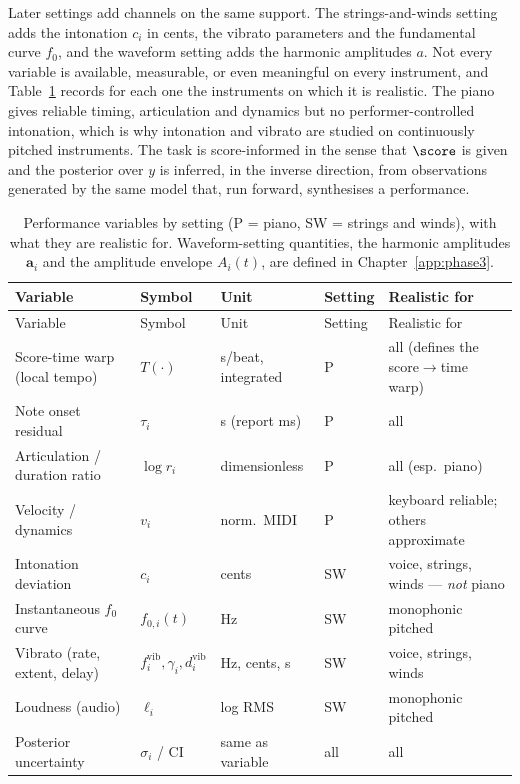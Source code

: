 Later settings add channels on the same support. The strings-and-winds
setting adds the intonation $c_i$ in cents, the vibrato parameters and the
fundamental curve $f_0$, and the waveform setting adds the harmonic
amplitudes $a$. Not every variable is available, measurable, or even
meaningful on every instrument, and Table~\ref{tab:variables} records for
each one the instruments on which it is realistic. The piano gives reliable
timing, articulation and dynamics but no performer-controlled intonation,
which is why intonation and vibrato are studied on continuously pitched
instruments. The task is score-informed in the sense that $\score$ is given
and the posterior over $y$ is inferred, in the inverse direction, from
observations generated by the same model that, run forward, synthesises a
performance.

{\footnotesize
\begin{longtable}{@{}p{3.1cm}p{2.0cm}p{2.0cm}p{0.9cm}p{4.4cm}@{}}
\caption{Performance variables by setting (P = piano, SW = strings and
winds), with what they are realistic for. Waveform-setting quantities,
the harmonic amplitudes $\mathbf a_i$ and the amplitude envelope $A_i(t)$, are
defined in Chapter~\ref{app:phase3}.}
\label{tab:variables}\\
\toprule
Variable & Symbol & Unit & Setting & Realistic for \\
\midrule
\endfirsthead
\toprule
Variable & Symbol & Unit & Setting & Realistic for \\
\midrule
\endhead
\bottomrule
\endfoot
Score-time warp (local tempo) & $T(\cdot)$ & s/beat, integrated & P & all (defines the score$\to$time warp) \\
Note onset residual & $\tau_i$ & s (report ms) & P & all \\
Articulation / duration ratio & $\log r_i$ & dimensionless & P & all (esp.\ piano) \\
Velocity / dynamics & $v_i$ & norm.\ MIDI & P & keyboard reliable; others approximate \\
Intonation deviation & $c_i$ & cents & SW & voice, strings, winds --- \emph{not} piano \\
Instantaneous $f_0$ curve & $f_{0,i}(t)$ & Hz & SW & monophonic pitched \\
Vibrato (rate, extent, delay) & $f_i^{\mathrm{vib}}, \gamma_i, d_i^{\mathrm{vib}}$ & Hz, cents, s & SW & voice, strings, winds \\
Loudness (audio) & $\ell_i$ & log RMS & SW & monophonic pitched \\
Posterior uncertainty & $\sigma_i$ / CI & same as variable & all & all \\
\end{longtable}}

